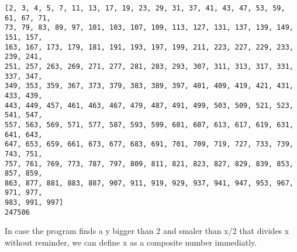 \documentclass[11pt]{article}
\begin{document}
    \begin{Verbatim}[commandchars=\\\{\}]
[2, 3, 4, 5, 7, 11, 13, 17, 19, 23, 29, 31, 37, 41, 43, 47, 53, 59, 61, 67, 71,
73, 79, 83, 89, 97, 101, 103, 107, 109, 113, 127, 131, 137, 139, 149, 151, 157,
163, 167, 173, 179, 181, 191, 193, 197, 199, 211, 223, 227, 229, 233, 239, 241,
251, 257, 263, 269, 271, 277, 281, 283, 293, 307, 311, 313, 317, 331, 337, 347,
349, 353, 359, 367, 373, 379, 383, 389, 397, 401, 409, 419, 421, 431, 433, 439,
443, 449, 457, 461, 463, 467, 479, 487, 491, 499, 503, 509, 521, 523, 541, 547,
557, 563, 569, 571, 577, 587, 593, 599, 601, 607, 613, 617, 619, 631, 641, 643,
647, 653, 659, 661, 673, 677, 683, 691, 701, 709, 719, 727, 733, 739, 743, 751,
757, 761, 769, 773, 787, 797, 809, 811, 821, 823, 827, 829, 839, 853, 857, 859,
863, 877, 881, 883, 887, 907, 911, 919, 929, 937, 941, 947, 953, 967, 971, 977,
983, 991, 997]
247506
    \end{Verbatim}

    In case the program finds a y bigger than 2 and smaler than x/2 that
divides x without reminder, we can define x as a composite number
immediatly.
\end{document}
